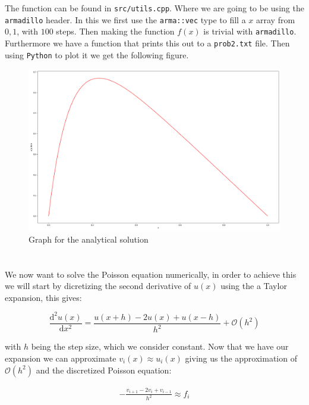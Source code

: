 \documentclass[a4paper,10pt,english]{article}
\newcommand{\dd}[1]{\mathrm{d}#1}
\begin{document}
The function can be found in \lstinline{src/utils.cpp}.
Where we are going to be using the \lstinline{armadillo} header.
In this we first use the \lstinline{arma::vec} type to fill a $x$ array from $0, 1$,
with $100$ steps.
Then making the function $f(x)$ is trivial with \lstinline{armadillo}.
Furthermore we have a function that prints this out to a \lstinline{prob2.txt} file.
Then using \lstinline{Python} to plot it we get the following figure.

\begin{figure}[H]
  \centering
  \includegraphics[width=1.0\linewidth]{figures/prob2.png}
  \caption{Graph for the analytical solution\label{fig:prob2}}
\end{figure}

\section{} %

We now want to solve the Poisson equation numerically, in order to achieve this
we will start by dicretizing the second derivative of $u(x)$ using the a Taylor
expansion, this gives:

\begin{equation}
    \frac{\dd{^{2}u(x)}}{\dd{x}^2} = \frac{u(x+h) - 2u(x) + u(x-h)}{h^2} + \mathcal{O}(h^2)
\end{equation}

with $h$ being the step size, which we consider constant. Now that we have our
expansion we can approximate $v_i(x) \approx u_i(x)$ giving us the approximation
of $\mathcal{O}(h^2)$ and the discretized Poisson equation:

\begin{align*}
     -\frac{v_{i+1} - 2v_i + v_{i-1}}{h^2} \approx f_i
\end{align*}
\end{document}
